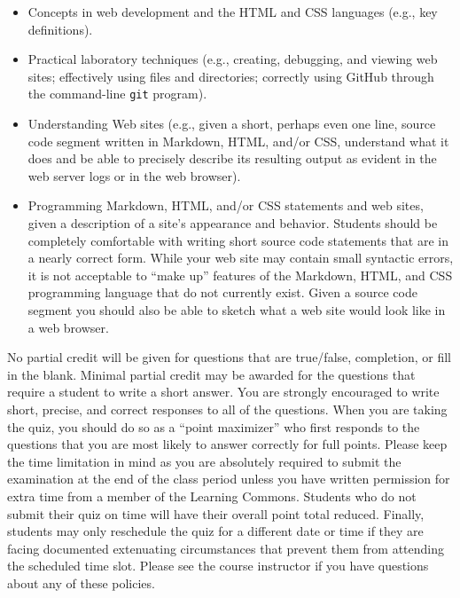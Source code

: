 \documentclass[11pt]{article}
\begin{document}
\vspace*{-.05in}
\begin{itemize}

  \itemsep 0in

  \item Concepts in web development and the HTML and CSS languages (e.g., key
    definitions).

  \item Practical laboratory techniques (e.g., creating, debugging, and viewing
    web sites; effectively using files and directories; correctly using GitHub
    through the command-line {\tt git} program).

  \item Understanding Web sites (e.g., given a short, perhaps even one line,
    source code segment written in Markdown, HTML, and/or CSS, understand what
    it does and be able to precisely describe its resulting output as evident in
    the web server logs or in the web browser).

  \item Programming Markdown, HTML, and/or CSS statements and web sites, given a
    description of a site's appearance and behavior. Students should be
    completely comfortable with writing short source code statements that are in
    a nearly correct form. While your web site may contain small syntactic
    errors, it is not acceptable to ``make up'' features of the Markdown, HTML,
    and CSS programming language that do not currently exist. Given a source
    code segment you should also be able to sketch what a web site would look
    like in a web browser.

\end{itemize}

\noindent No partial credit will be given for questions that are true/false,
completion, or fill in the blank. Minimal partial credit may be awarded for the
questions that require a student to write a short answer. You are strongly
encouraged to write short, precise, and correct responses to all of the
questions. When you are taking the quiz, you should do so as a ``point
maximizer'' who first responds to the questions that you are most likely to
answer correctly for full points. Please keep the time limitation in mind as you
are absolutely required to submit the examination at the end of the class period
unless you have written permission for extra time from a member of the Learning
Commons. Students who do not submit their quiz on time will have their overall
point total reduced. Finally, students may only reschedule the quiz for a
different date or time if they are facing documented extenuating circumstances
that prevent them from attending the scheduled time slot. Please see the course
instructor if you have questions about any of these policies.
\end{document}
